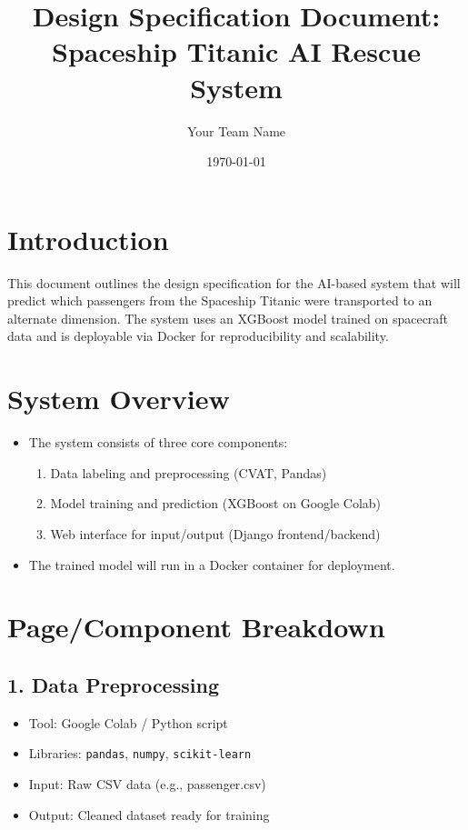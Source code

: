 \documentclass[12pt]{article}
\title{Design Specification Document: Spaceship Titanic AI Rescue System}
\author{Your Team Name}
\date{\today}
\begin{document}
\maketitle
\tableofcontents
\newpage

\section{Introduction}
This document outlines the design specification for the AI-based system that will predict which passengers from the Spaceship Titanic were transported to an alternate dimension. The system uses an XGBoost model trained on spacecraft data and is deployable via Docker for reproducibility and scalability.

\section{System Overview}
\begin{itemize}
    \item The system consists of three core components:
    \begin{enumerate}
        \item Data labeling and preprocessing (CVAT, Pandas)
        \item Model training and prediction (XGBoost on Google Colab)
        \item Web interface for input/output (Django frontend/backend)
    \end{enumerate}
    \item The trained model will run in a Docker container for deployment.
\end{itemize}

\section{Page/Component Breakdown}

\subsection{1. Data Preprocessing}
\begin{itemize}
    \item Tool: Google Colab / Python script
    \item Libraries: \texttt{pandas}, \texttt{numpy}, \texttt{scikit-learn}
    \item Input: Raw CSV data (e.g., passenger.csv)
    \item Output: Cleaned dataset ready for training
\end{itemize}
\end{document}
